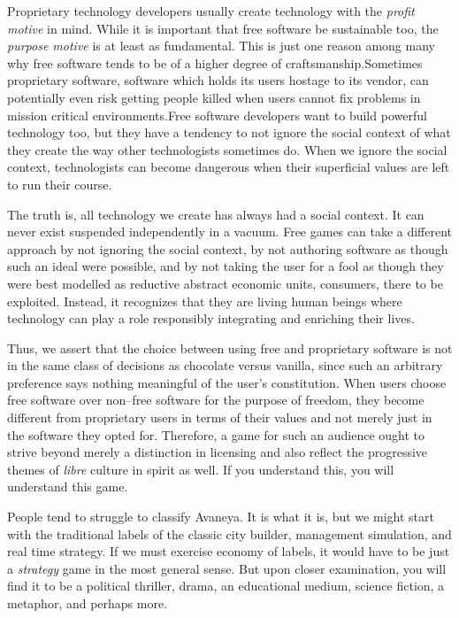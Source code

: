 Proprietary technology developers usually create technology with the {\it profit motive} in mind. While it is important that free software be sustainable too, the {\it purpose motive} is at least as fundamental. This is just one reason among many why free software tends to be of a higher degree of craftsmanship. Sometimes proprietary software, software which holds its users hostage to its vendor, can potentially even risk getting people killed when users cannot fix problems in mission critical environments. Free software developers want to build powerful technology too, but they have a tendency to not ignore the social context of what they create the way other technologists sometimes do. When we ignore the social context, technologists can become dangerous when their superficial values are left to run their course.\footnotecite[black2012]\footnotecite[brew2012]

The truth is, all technology we create has always had a social context. It can never exist suspended independently in a vacuum. Free games can take a different approach by not ignoring the social context, by not authoring software as though such an ideal were possible, and by not taking the user for a fool as though they were best modelled as reductive abstract economic units, consumers, there to be exploited. Instead, it recognizes that they are living human beings where technology can play a role responsibly integrating and enriching their lives. 

Thus, we assert that the choice between using free and proprietary software is not in the same class of decisions as chocolate versus vanilla, since such an arbitrary preference says nothing meaningful of the user's constitution. When users choose free software over non--free software for the purpose of freedom, they become different from proprietary users in terms of their values and not merely just in the software they opted for. Therefore, a game for such an audience ought to strive beyond merely a distinction in licensing and also reflect the progressive themes of {\it libre} culture in spirit as well. If you understand this, you will understand this game.

People tend to struggle to classify Avaneya. It is what it is, but we might start with the traditional labels of the classic city builder, management simulation, and real time strategy. If we must exercise economy of labels, it would have to be just a {\it strategy} game in the most general sense. But upon closer examination, you will find it to be a political thriller, drama, an educational medium, science fiction, a metaphor, and perhaps more.

